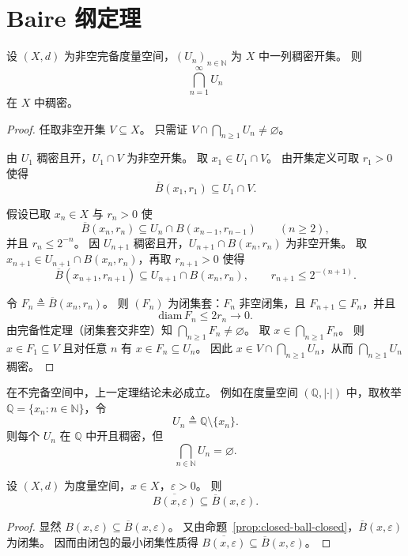 \documentclass[lang=cn,a4paper,newtx,section]{elegantbook}
\begin{document}
\section{Baire 纲定理}

\begin{theorem}[Baire]\label{thm:baire-category}
  设 $(X,d)$ 为非空完备度量空间，$(U_n)_{n\in\mathbb{N}}$ 为 $X$ 中一列稠密开集。
  则
  \[
    \bigcap_{n=1}^{\infty}U_n
  \]
  在 $X$ 中稠密。
\end{theorem}

\begin{proof}
  任取非空开集 $V\subseteq X$。
  只需证 $V\cap\bigcap_{n\ge1}U_n\ne\varnothing$。

  由 $U_1$ 稠密且开，$U_1\cap V$ 为非空开集。
  取 $x_1\in U_1\cap V$。
  由开集定义可取 $r_1>0$ 使得
  \[
    \overline{B}(x_1,r_1)\subseteq U_1\cap V.
  \]

  假设已取 $x_n\in X$ 与 $r_n>0$ 使
  \[
    \overline{B}(x_n,r_n)\subseteq U_n\cap B(x_{n-1},r_{n-1})\qquad(n\ge2),
  \]
  并且 $r_n\le 2^{-n}$。
  因 $U_{n+1}$ 稠密且开，$U_{n+1}\cap B(x_n,r_n)$ 为非空开集。
  取 $x_{n+1}\in U_{n+1}\cap B(x_n,r_n)$，再取 $r_{n+1}>0$ 使得
  \[
    \overline{B}(x_{n+1},r_{n+1})\subseteq U_{n+1}\cap B(x_n,r_n),\qquad r_{n+1}\le 2^{-(n+1)}.
  \]

  令 $F_n\triangleq\overline{B}(x_n,r_n)$。
  则 $(F_n)$ 为闭集套：$F_n$ 非空闭集，且 $F_{n+1}\subseteq F_n$，并且
  \[
    \mathrm{diam}\,F_n\le 2r_n\to 0.
  \]
  由完备性定理（闭集套交非空）知 $\bigcap_{n\ge1}F_n\ne\varnothing$。
  取 $x\in\bigcap_{n\ge1}F_n$。
  则 $x\in F_1\subseteq V$ 且对任意 $n$ 有 $x\in F_n\subseteq U_n$。
  因此 $x\in V\cap\bigcap_{n\ge1}U_n$，从而 $\bigcap_{n\ge1}U_n$ 稠密。
\end{proof}

\begin{example}
  在不完备空间中，上一定理结论未必成立。
  例如在度量空间 $(\mathbb{Q},|\cdot|)$ 中，取枚举 $\mathbb{Q}=\{x_n:n\in\mathbb{N}\}$，令
  \[
    U_n\triangleq \mathbb{Q}\setminus\{x_n\}.
  \]
  则每个 $U_n$ 在 $\mathbb{Q}$ 中开且稠密，但
  \[
    \bigcap_{n\in\mathbb{N}}U_n=\varnothing.
  \]
\end{example}

\begin{corollary}
  设 $(X,d)$ 为度量空间，$x\in X$，$\varepsilon>0$。
  则
  \[
    \overline{B(x,\varepsilon)}\subseteq \overline{B}(x,\varepsilon).
  \]
\end{corollary}

\begin{proof}
  显然 $B(x,\varepsilon)\subseteq\overline{B}(x,\varepsilon)$。
  又由命题~\ref{prop:closed-ball-closed}，$\overline{B}(x,\varepsilon)$ 为闭集。
  因而由闭包的最小闭集性质得 $\overline{B(x,\varepsilon)}\subseteq\overline{B}(x,\varepsilon)$。
\end{proof}
\end{document}

